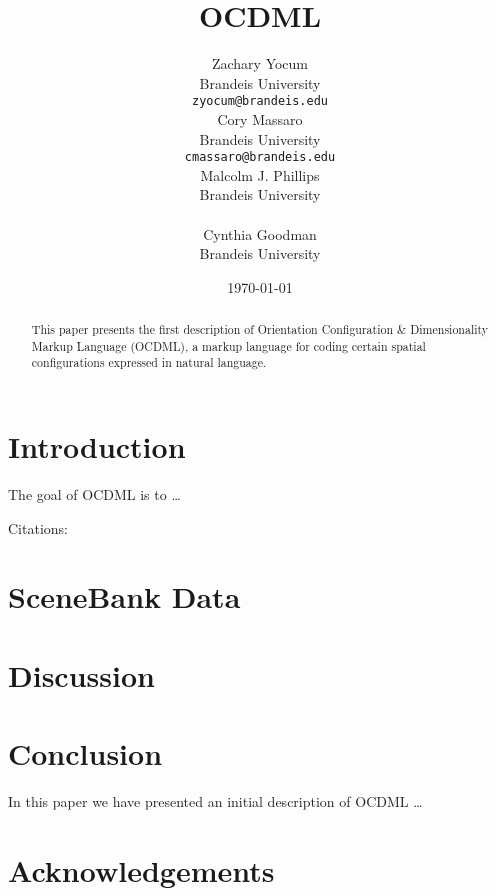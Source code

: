 \documentclass[11pt]{article}
\title{OCDML}
\author{
    Zachary Yocum \\
    Brandeis University \\
    \texttt{zyocum@brandeis.edu} \\\And
    Cory Massaro \\
    Brandeis University \\
    \texttt{cmassaro@brandeis.edu} \\\And
    Malcolm J. Phillips \\
    Brandeis University \\
    \textt{icos@brandeis.edu} \\\And
    Cynthia Goodman\\
    Brandeis University \\
    \textt{cpg@brandeis.edu}
    }
\date{\today}
\begin{document}

%


\begin{abstract}
This paper presents the first description of Orientation Configuration \& Dimensionality Markup Language (OCDML), a markup language for coding certain spatial configurations expressed in natural language.
\end{abstract}

\section{Introduction} %
\label{sec:introduction}
The goal of OCDML is to \ldots

Citations:
\cite{cohn1997qualitative}
\cite{isli2000new}
\cite{cristani2002spaceml}
\cite{slobin2001sign}
\cite{mani2010spatialml}
\cite{talmy1978figure}
\cite{herskovits1980spatial}

\section{SceneBank Data} %
\label{scenebank_data}

\section{Discussion} %
\label{sec:discussion}

\section{Conclusion} %
\label{sec:conclusion}
In this paper we have presented an initial description of OCDML \ldots

\section*{Acknowledgements} %
\label{sec:acknowledgements}




\end{document}
